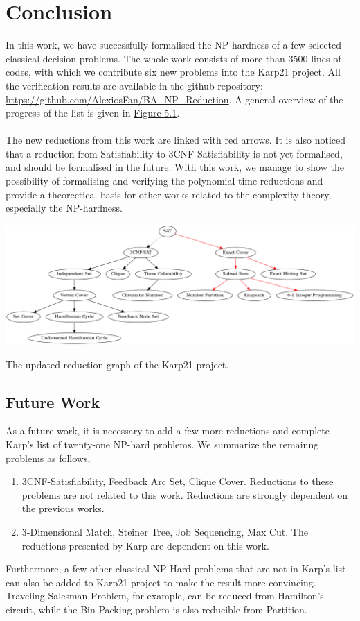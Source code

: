 \chapter{Conclusion}\label{chapter:conclusion}
In this work, we have successfully formalised the NP-hardness of 
a few selected classical decision problems.  
The whole work consists of more than 3500 lines of codes, with which we contribute 
six new problems into the Karp21 project. All the verification results are available in the github repository: 
\url{https://github.com/AlexiosFan/BA_NP_Reduction}. 
A general overview of the progress of the list is given in \hyperref[fig:5.1]{Figure 5.1}.\\\\
The new reductions from this work are linked with red arrows. 
It is also noticed that a reduction from Satisfiability to 3CNF-Satisfiability is not yet
formalised, and should be formalised in the future. With this work,
we manage to show the possibility of formalising and verifying the polynomial-time
reductions and provide a theorectical basis for other works related 
to the complexity theory, especially the NP-hardness. 
\begin{oldfigure}[h!]
\centering 
\includegraphics[angle = 90, scale=0.39]{figures/reductions_new.png}
\caption{The updated reduction graph of the Karp21 project.}
\label{fig:5.1}
\end{oldfigure}

\section*{Future Work}
As a future work, it is necessary to add a few more reductions and complete Karp's 
list of twenty-one NP-hard problems. We summarize the remainng problems as follows,
\begin{enumerate}
    \item 3CNF-Satisfiability, Feedback Arc Set, Clique Cover. Reductions to these problems 
    are not related to this work. Reductions are strongly dependent on the previous works.
    \item 3-Dimensional Match, Steiner Tree, Job Sequencing, Max Cut. The reductions 
    presented by Karp are dependent on this work.
\end{enumerate}
Furthermore, a few other classical NP-Hard problems that are not in Karp's list 
can also be added to Karp21 project to make the result more convincing.
Traveling Salesman Problem, for example, 
can be reduced from Hamilton's circuit, while the Bin Packing problem is also 
reducible from Partition. 
